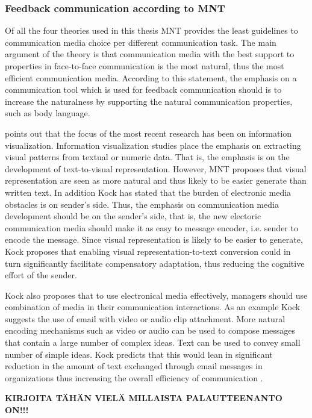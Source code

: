 \documentclass[english,12pt,a4paper,pdftex]{article}
\begin{document}
\subsubsection{Feedback communication according to MNT}

Of all the four theories used in this thesis \ac{MNT} provides the least guidelines to communication media choice per different communication task. The main argument of the theory is that communication media with the best support to properties in face-to-face communication is the most natural, thus the most efficient communication media. According to this statement, the emphasis on a communication tool which is used for feedback communication should is to increase the naturalness by supporting the natural communication properties, such as body language. \citep{kock2005} \citep{kock2004}

\citet{kock2007} points out that the focus of the most recent research has been on information visualization. Information visualization studies place the emphasis on extracting visual patterns from textual or numeric data. That is, the emphasis is on the development of text-to-visual representation. However, \ac{MNT} proposes that visual representation are seen as more natural and thus likely to be easier generate than written text. In addition Kock has stated that the burden of electronic media obstacles is on sender's side. Thus, the emphasis on communication media development should be on the sender's side, that is, the new electoric communication media should make it as easy to message encoder, i.e. sender to encode the message. Since visual representation is likely to be easier to generate, Kock proposes that enabling visual representation-to-text conversion could in turn significantly facilitate compensatory adaptation, thus reducing the cognitive effort of the sender.

Kock also proposes that to use electronical media effectively, managers should use combination of media in their communication interactions. As an example Kock suggests the use of email with video or audio clip attachment. More natural encoding mechanisms such as video or audio can be used to compose messages that contain a large number of complex ideas. Text can be used to convey small number of simple ideas. Kock predicts that this would lean in significant reduction in the amount of text exchanged through email messages in organizations thus increasing the overall efficiency of communication \citet{kock2007}.

\textbf{KIRJOITA TÄHÄN VIELÄ MILLAISTA PALAUTTEENANTO ON!!!}
\end{document}
